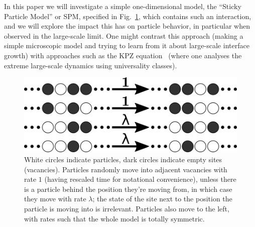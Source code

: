 In this paper we will
investigate a simple one-dimensional model, the ``Sticky Particle Model'' or SPM, specified in Fig.~\ref{fig:rates}, which contains such an interaction, and we will explore the impact this has on particle behavior, in particular
when observed in the large-scale limit.
One might contrast
this approach (making a simple microscopic model and trying to learn from it about large-scale interface growth) with approaches such as the KPZ equation~\cite{PhysRevLett.56.889, PhysRevA.38.4271, Sasamoto2010} (where one analyses the extreme
large-scale dynamics using universality classes).

\begin{figure}
\vspace{1em}
\caption{\label{fig:rates} White circles indicate particles, dark circles indicate empty sites (vacancies). Particles randomly move into adjacent vacancies with rate $1$ (having rescaled time for notational convenience), unless there is a
particle behind the position they're moving from, in which case they move with rate $\lambda$; the state of the site next to the position the particle is moving into is irrelevant.
Particles also move to the left, with rates such that the whole model is totally symmetric.}
    \includegraphics[width=\linewidth]{../tex-src/images/newRates}
    \vspace{-3em}
\end{figure}
